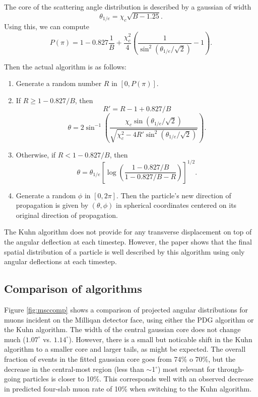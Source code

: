 \documentclass[11pt]{article}
\begin{document}
The core of the scattering angle distribution is described by a gaussian of width
\begin{equation}
\theta_{1/e} = \chi_c\sqrt{B-1.25}.
\end{equation}
Using this, we can compute
\begin{equation}
P(\pi) = 1-0.827\frac{1}{B}+\frac{\chi_c^2}{4}\left(\frac{1}{\sin^2(\theta_{1/e}/\sqrt{2})} - 1\right).
\end{equation}

Then the actual algorithm is as follows: 
\begin{enumerate}
\item Generate a random number $R$ in $[0,P(\pi)]$. 
\item If $R\geq1-0.827/B$, then
\[
R' = R - 1 + 0.827/B
\]
\begin{equation}
\theta = 2\sin^{-1}\left(\frac{\chi_c\sin(\theta_{1/e}/\sqrt{2})}{\sqrt{\chi_c^2-4R'\sin^2(\theta_{1/e}/\sqrt{2})}}\right).
\end{equation}
\item Otherwise, if $R<1-0.827/B$, then
\begin{equation}
\theta = \theta_{1/e}\left[\log\left(\frac{1-0.827/B}{1-0.827/B-R}\right)\right]^{1/2}.
\end{equation}
\item Generate a random $\phi$ in $[0,2\pi]$. Then the particle's new direction of propagation is given by $(\theta,\phi)$ 
in spherical coordinates centered on its original direction of propagation.
\end{enumerate}

The Kuhn algorithm does not provide for any transverse displacement on top of the angular deflection at each timestep.
However, the paper shows that the final spatial distribution of a particle is well described by this algorithm
using only angular deflections at each timestep.

\subsection{Comparison of algorithms}
Figure \ref{fig:msccomp} shows a comparison of projected angular distributions for muons incident on the Milliqan detector face,
using either the PDG algorithm or the Kuhn algorithm. The width of the central gaussian core does not change much
($1.07^\circ$ vs. $1.14^\circ$). However, there is a small but noticable shift in the Kuhn algorithm to a smaller core and
larger tails, as might be expected. The overall fraction of events in the fitted gaussian core goes from 74\% o 70\%,
but the decrease in the central-most region (less than $\sim$1$^\circ$) most relevant for through-going particles
 is closer to 10\%. This corresponds well with an observed decrease in predicted four-slab muon rate of
10\% when switching to the Kuhn algorithm.
\end{document}

